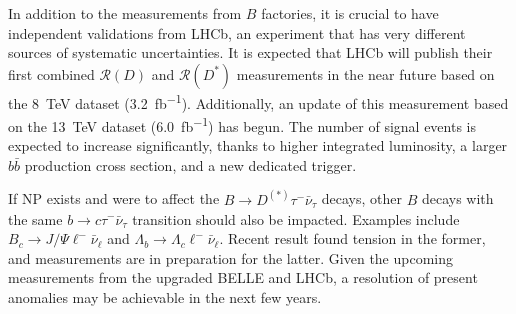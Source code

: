 \documentclass[12pt,letterpaper]{article}
\newcommand{\PRLrule}{
    \bigskip
    \noindent\makebox[\linewidth]{
        \resizebox{0.3333\linewidth}{1pt}{$\blacklozenge$}
    }
    \bigskip
}
\def\RD/{\ensuremath{\mathcal{R}(D)}}
\def\RDst/{\ensuremath{\mathcal{R}(D^{*})}}
\def\DDst/{\ensuremath{D^{(*)}}}
\newcommand{\BMesonMode}[2]{\ensuremath{
    B \rightarrow #2 #1^- \bar{\nu}_#1
}}
\newcommand{\BDDstMode}[1]{\BMesonMode{#1}{\DDst/}}
\begin{document}
In addition to the measurements from $B$ factories, it is crucial to have
independent validations from LHCb, an experiment that has very different sources
of systematic uncertainties.
It is expected that LHCb will publish their first combined \RD/ and \RDst/
measurements in the near future based on the \SI{8}{TeV} dataset
(\SI{3.2}{fb^{-1}}).
Additionally, an update of this measurement based on the \SI{13}{TeV} dataset
(\SI{6.0}{fb^{-1}}) has begun.
The number of signal events is expected to increase significantly, thanks to
higher integrated luminosity, a larger $b \bar{b}$ production cross section, and
a new dedicated trigger.


If NP exists and were to affect the \BDDstMode{\tau} decays, other $B$ decays
with the same $b \rightarrow c \tau^- \bar{\nu}_\tau$ transition should also be
impacted.
Examples include $B_c \rightarrow J/\Psi \ell^- \bar{\nu}_\ell$ and
$\Lambda_b \rightarrow \Lambda_c \ell^- \bar{\nu}_\ell$.
Recent result \cite{Aaij:2017tyk} found tension in the former, and measurements
are in preparation for the latter.
Given the upcoming measurements from the upgraded BELLE and LHCb, a
resolution of present anomalies may be achievable in the next few years.

\FloatBarrier
\PRLrule
\printbibliography
\end{document}
